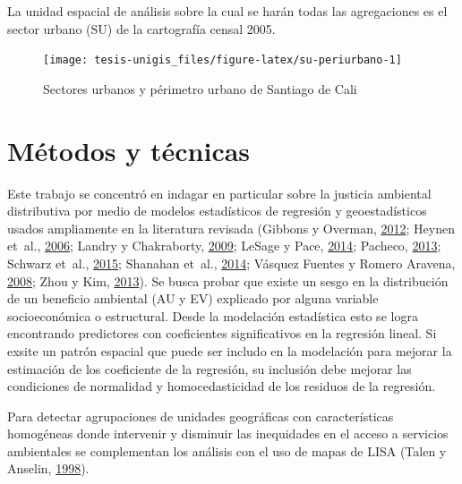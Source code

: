 \documentclass[12pt,a4paper,oneside, openany]{book}
\theoremstyle{definition}
\theoremstyle{definition}
\theoremstyle{definition}
\theoremstyle{remark}
\begin{document}
La unidad espacial de análisis sobre la cual se harán todas las
agregaciones es el sector urbano (SU) de la cartografía censal 2005.

\begin{figure}[H]

{\centering \texttt{[image: tesis-unigis\_files/figure-latex/su-periurbano-1]} 

}

\caption{Sectores urbanos y périmetro urbano de Santiago de Cali}\label{fig:su-periurbano}
\end{figure}

\section{Métodos y técnicas}\label{muxe9todos-y-tuxe9cnicas}

Este trabajo se concentró en indagar en particular sobre la justicia
ambiental distributiva por medio de modelos estadísticos de regresión y
geoestadísticos usados ampliamente en la literatura revisada (Gibbons y
Overman, \protect\hyperlink{ref-gibbons_mostly_2012}{2012}; Heynen
et~al., \protect\hyperlink{ref-heynen_political_2006}{2006}; Landry y
Chakraborty, \protect\hyperlink{ref-landry_street_2009}{2009}; LeSage y
Pace, \protect\hyperlink{ref-lesage_biggest_2014}{2014}; Pacheco,
\protect\hyperlink{ref-PACHECO2013121}{2013}; Schwarz et~al.,
\protect\hyperlink{ref-schwarz_trees_2015}{2015}; Shanahan et~al.,
\protect\hyperlink{ref-shanahan_socio-economic_2014}{2014}; Vásquez
Fuentes y Romero Aravena,
\protect\hyperlink{ref-vasquez_fuentes_vegetacion_2008}{2008}; Zhou y
Kim, \protect\hyperlink{ref-zhou_social_2013}{2013}). Se busca probar
que existe un sesgo en la distribución de un beneficio ambiental (AU y
EV) explicado por alguna variable socioeconómica o estructural. Desde la
modelación estadística esto se logra encontrando predictores con
coeficientes significativos en la regresión lineal. Si exsite un patrón
espacial que puede ser includo en la modelación para mejorar la
estimación de los coeficiente de la regresión, su inclusión debe mejorar
las condiciones de normalidad y homocedasticidad de los residuos de la
regresión.

Para detectar agrupaciones de unidades geográficas con características
homogéneas donde intervenir y disminuir las inequidades en el acceso a
servicios ambientales se complementan los análisis con el uso de mapas
de LISA (Talen y Anselin,
\protect\hyperlink{ref-talen_assessing_1998}{1998}).
\end{document}
